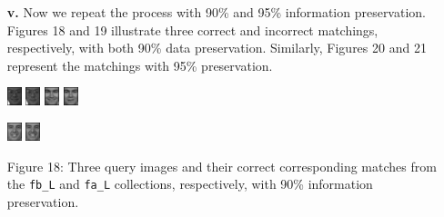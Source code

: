 \documentclass[ 12pt ]{article}
\begin{document}
\begin{enumerate}
\begin{enumerate}
            \item[\textbf{v.}] Now we repeat the process with 90\% and 95\% information preservation. Figures 18 and 19 illustrate three correct and incorrect matchings, respectively,
                with both 90\% data preservation. Similarly, Figures 20 and 21 represent the matchings with 95\% preservation.
                \begin{center}
                    \includegraphics[scale=5]{f_l_images/AnyConv.com__00182_940422_fb_a}
                    \includegraphics[scale=5]{f_l_images/AnyConv.com__00182_940422_fa_a}
                    \includegraphics[scale=5]{f_l_images/AnyConv.com__00753_941201_fb}
                    \includegraphics[scale=5]{f_l_images/AnyConv.com__00753_941201_fa}
                \end{center}
                \begin{center}
                    \includegraphics[scale=5]{f_l_images/AnyConv.com__00501_940519_fb}
                    \includegraphics[scale=5]{f_l_images/AnyConv.com__00501_940519_fa}
                \end{center}
                \begin{center}
                    \scriptsize
                    Figure 18: Three query images and their correct corresponding matches from the \verb|fb_L| and \verb|fa_L| collections, respectively, with 90\%
                    information preservation.
                \end{center}
                \newpage


\end{enumerate}
\end{enumerate}
\end{document}
